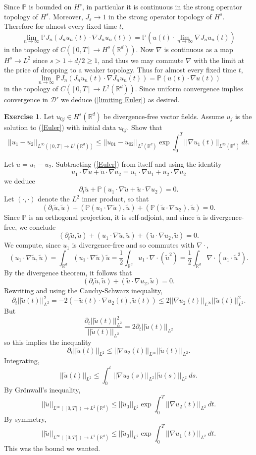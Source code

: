 \documentclass[10pt]{article}
\newcommand{\RR}{\mathbb{R}}
\newcommand{\PP}{\mathbb P}
\theoremstyle{definition}
\newtheorem{exer}{Exercise}
\begin{document}
Since $\PP$ is bounded on $H^s$, in particular it is continuous in the strong operator topology of $H^s$.
Moreover, $J_\varepsilon \to 1$ in the strong operator topology of $H^s$.
Therefore for almost every fixed time $t$,
$$\lim_{n \to \infty} \PP J_n(J_n u_n(t) \cdot \nabla J_n u_n(t)) = \PP\left(u(t) \cdot \lim_{n \to \infty} \nabla J_n u_n(t)\right)$$
in the topology of $C([0, T] \to H^s(\RR^d))$.
Now $\nabla$ is continuous as a map $H^s \to L^2$ since $s > 1 + d/2 \geq 1$, and thus we may commute $\nabla$ with the limit at the price of dropping to a weaker topology.
Thus for almost every fixed time $t$,
$$\lim_{n \to \infty} \PP J_n(J_n u_n(t) \cdot \nabla J_n u_n(t)) = \PP\left(u(t) \cdot \nabla u(t)\right)$$
in the topology of $C([0, T] \to L^2(\RR^d))$.
Since uniform convergence implies convergence in $\mathcal D'$ we deduce (\ref{limiting Euler}) as desired.

\begin{exer}
Let $u_{0j} \in H^s(\RR^d)$ be divergence-free vector fields. Assume $u_j$ is the solution to (\ref{Euler}) with initial data $u_{0j}$.
Show that
$$||u_1 - u_2||_{L^\infty([0, T] \to L^2(\RR^d))} \leq ||u_{01} - u_{02}||_{L^2(\RR^d)} \exp \int_0^T ||\nabla u_1(t)||_{L^\infty(\RR^d)} ~dt.$$
\end{exer}

Let $\tilde u = u_1 - u_2$.
Subtracting (\ref{Euler}) from itself and using the identity
$$u_1 \cdot \nabla \tilde u + \tilde u \cdot \nabla u_2 = u_1 \cdot \nabla u_1 + u_2 \cdot \nabla u_2$$
we deduce
$$\partial_t \tilde u + \PP(u_1 \cdot \nabla \tilde u + \tilde u \cdot \nabla u_2) = 0.$$
Let $(\cdot, \cdot)$ denote the $L^2$ inner product, so that
$$(\partial_t \tilde u, \tilde u) + (\PP(u_1 \cdot \nabla \tilde u), \tilde u) + (\PP(\tilde u \cdot \nabla u_2), \tilde u) = 0.$$
Since $\PP$ is an orthogonal projection, it is self-adjoint, and since $\tilde u$ is divergence-free, we conclude
$$(\partial_t \tilde u, \tilde u) + (u_1 \cdot \nabla \tilde u, \tilde u) + (\tilde u \cdot \nabla u_2, \tilde u) = 0.$$
We compute, since $u_1$ is divergence-free and so commutes with $\nabla \cdot$,
$$(u_1 \cdot \nabla \tilde u, \tilde u) = \int_{\RR^d} (u_1 \cdot \nabla \tilde u)\tilde u
= \frac{1}{2} \int_{\RR^d} u_1 \cdot \nabla \cdot (\tilde u^2) = \frac{1}{2} \int_{\RR^d} \nabla \cdot(u_1 \cdot \tilde u^2).$$
By the divergence theorem, it follows that
$$(\partial_t \tilde u, \tilde u) + (\tilde u \cdot \nabla u_2, \tilde u) = 0.$$
Rewriting and using the Cauchy-Schwarz inequality,
$$\partial_t ||\tilde u(t)||_{L^2}^2 = -2(-\tilde u(t) \cdot \nabla u_2(t), \tilde u(t)) \leq 2||\nabla u_2(t)||_{L^\infty} ||\tilde u(t)||_{L^2}^2.$$
But
$$\frac{\partial_t ||\tilde u(t)||_{L^2}^2}{||\tilde u(t)||_{L^2}} = 2\partial_t ||\tilde u(t)||_{L^2}$$
so this implies the inequality
$$\partial_t ||\tilde u(t)||_{L^2} \leq ||\nabla u_2(t)||_{L^\infty} ||\tilde u(t)||_{L^2}.$$
Integrating,
$$||\tilde u(t)||_{L^2} \leq \int_0^t ||\nabla u_2(s)||_{L^2} ||\tilde u(s)||_{L^2} ~ds.$$
By Gr\"onwall's inequality,
$$||\tilde u||_{L^\infty([0, T]) \to L^2(\RR^d)} \leq ||\tilde u_0||_{L^2} \exp \int_0^T ||\nabla u_2(t)||_{L^2} ~dt.$$
By symmetry,
$$||\tilde u||_{L^\infty([0, T]) \to L^2(\RR^d)} \leq ||\tilde u_0||_{L^2} \exp \int_0^T ||\nabla u_1(t)||_{L^2} ~dt.$$
This was the bound we wanted.
\end{document}
